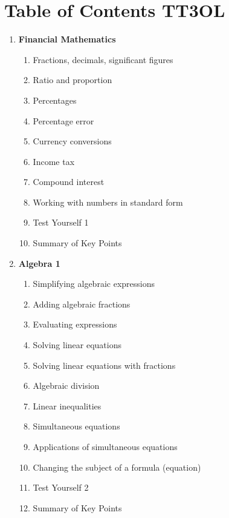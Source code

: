 \documentclass{article}
\begin{document}
\section*{Table of Contents TT3OL}

\begin{enumerate}
    \item \textbf{Financial Mathematics}
    \begin{enumerate}
        \item Fractions, decimals, significant figures
        \item Ratio and proportion
        \item Percentages
        \item Percentage error
        \item Currency conversions
        \item Income tax
        \item Compound interest
        \item Working with numbers in standard form
        \item Test Yourself 1
        \item Summary of Key Points
    \end{enumerate}

    \item \textbf{Algebra 1}
    \begin{enumerate}
        \item Simplifying algebraic expressions
        \item Adding algebraic fractions
        \item Evaluating expressions
        \item Solving linear equations
        \item Solving linear equations with fractions
        \item Algebraic division
        \item Linear inequalities
        \item Simultaneous equations
        \item Applications of simultaneous equations
        \item Changing the subject of a formula (equation)
        \item Test Yourself 2
        \item Summary of Key Points
    \end{enumerate}


\end{enumerate}
\end{document}
